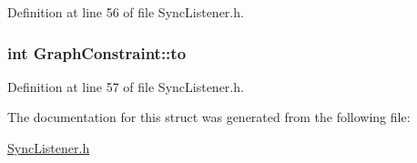 \-Definition at line 56 of file \-Sync\-Listener.\-h.

\hypertarget{structGraphConstraint_aacbe0ea6278c9005bec666c1df276912}{
\subsubsection[{to}]{\setlength{\rightskip}{0pt plus 5cm}int {\bf \-Graph\-Constraint\-::to}}}\label{structGraphConstraint_aacbe0ea6278c9005bec666c1df276912}


\-Definition at line 57 of file \-Sync\-Listener.\-h.



\-The documentation for this struct was generated from the following file\-:\begin{DoxyCompactItemize}
\item 
\hyperlink{SyncListener_8h}{\-Sync\-Listener.\-h}\end{DoxyCompactItemize}
